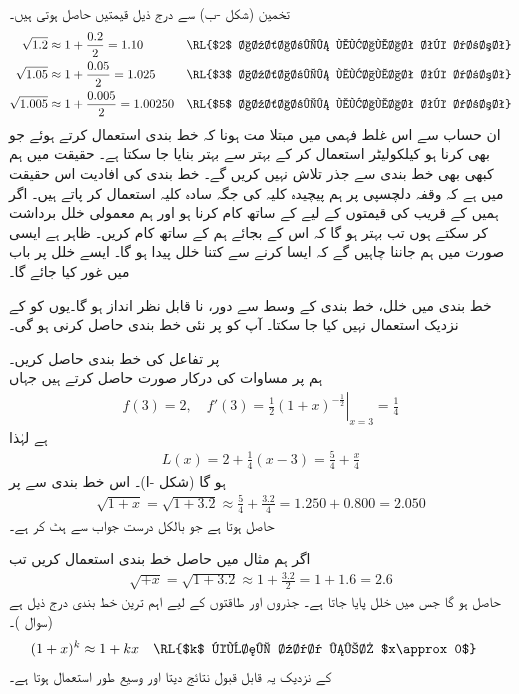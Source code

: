 تخمین  (شکل -ب) سے درج ذیل قیمتیں حاصل ہوتی ہیں۔
\begin{align*}
\sqrt{1.2}&\approx 1+\frac{0.2}{2}=1.10&& \text{\RL{$2$ اعشاریہ مقامات تک درست}}\\
\sqrt{1.05}&\approx 1+\frac{0.05}{2}=1.025&& \text{\RL{$3$ اعشاریہ مقامات تک درست}}\\
\sqrt{1.005}&\approx 1+\frac{0.005}{2}=1.00250&& \text{\RL{$5$ اعشاریہ مقامات تک درست}}\\
\end{align*}
ان حساب سے اس غلط فہمی میں مبتلا مت ہونا کہ خط بندی استعمال کرتے ہوئے جو بھی کرنا    ہو کیلکولیٹر استعمال کر کے بہتر سے بہتر بنایا جا سکتا ہے۔ حقیقت میں ہم کبھی بھی خط بندی سے جذر تلاش نہیں کریں گے۔ خط بندی کی افادیت اس حقیقت میں ہے کہ وقفہ دلچسپی پر ہم پیچیدہ کلیہ کی جگہ سادہ کلیہ استعمال کر پاتے ہیں۔ اگر ہمیں  کے قریب  کی قیمتوں کے لیے  کے ساتھ کام کرنا ہو اور ہم معمولی خلل  برداشت کر سکتے ہوں تب بہتر ہو گا کہ اس کے  بجائے ہم  کے ساتھ کام کریں۔ ظاہر ہے ایسی صورت میں ہم جاننا چاہیں گے کہ ایسا کرنے سے کتنا خلل پیدا ہو گا۔ ایسے خلل پر باب  میں غور کیا جائے گا۔

خط بندی میں خلل، خط بندی کے وسط سے دور،  نا قابل نظر انداز ہو گا۔یوں  کو  کے نزدیک استعمال نہیں کیا جا سکتا۔ آپ کو  پر نئی خط بندی حاصل کرنی ہو گی۔ 

 پر تفاعل  کی خط بندی حاصل کریں۔ \\
ہم  پر مساوات  کی درکار صورت حاصل کرتے ہیں جہاں
\begin{align*}
f(3)=2,\quad f'(3)=\left.\frac{1}{2}(1+x)^{-\tfrac{1}{2}}\right|_{x=3}=\frac{1}{4}
\end{align*}
ہے لہٰذا
\begin{align*}
L(x)=2+\frac{1}{4}(x-3)=\frac{5}{4}+\frac{x}{4}
\end{align*}
ہو گا (شکل -ا)۔ اس خط بندی سے  پر 
\begin{align*}
\sqrt{1+x}=\sqrt{1+3.2}\approx \frac{5}{4}+\frac{3.2}{4}=1.250+0.800=2.050
\end{align*}
حاصل ہوتا ہے جو بالکل درست جواب  سے  ہٹ کر ہے۔

اگر ہم مثال  میں حاصل خط بندی استعمال کریں تب 
\begin{align*}
\sqrt{+x}=\sqrt{1+3.2}\approx 1+\frac{3.2}{2}=1+1.6=2.6
\end{align*}
حاصل ہو گا جس میں  خلل پایا جاتا ہے۔
جذروں اور طاقتوں کے لیے اہم ترین خط بندی درج ذیل ہے (سوال )۔
\begin{align}\label{مساوات_استعمال_طاقت_خطی_تخمین}
(1+x)^k&\approx 1+kx&&\text{\RL{$k$ کوئی عدد ہے؛ $x\approx 0$}}
\end{align}
 کے نزدیک یہ قابل قبول نتائج دیتا   اور  وسیع طور استعمال ہوتا ہے۔

